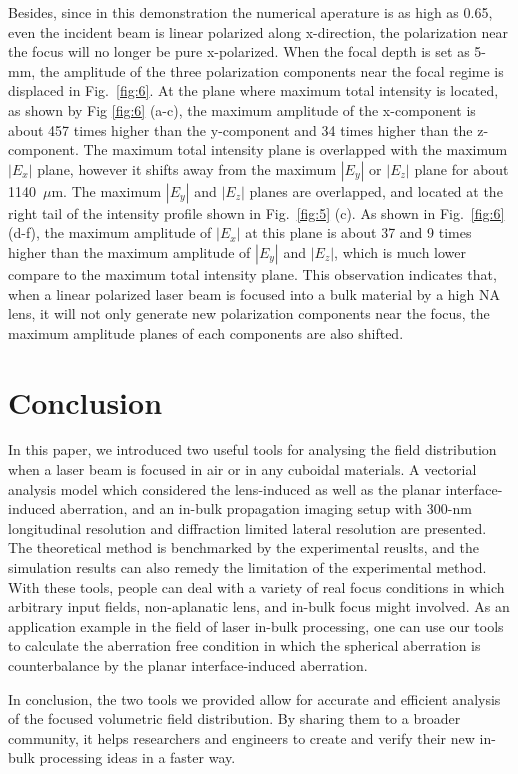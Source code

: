 \documentclass[9pt,twocolumn,twoside]{osajnl}
\begin{document}
Besides, since in this demonstration the numerical aperature is as high as 0.65, even the incident beam is linear polarized along x-direction, the polarization near the focus will no longer be pure x-polarized. When the focal depth is set as 5-mm, the amplitude of the three polarization components near the focal regime is displaced in Fig.~\ref{fig:6}. At the plane where maximum total intensity is located, as shown by Fig \ref{fig:6} (a-c), the maximum amplitude of the x-component is about 457 times higher than the y-component and 34 times higher than the z-component. The maximum total intensity plane is overlapped with the maximum $|E_x|$ plane, however it shifts away from the maximum $|E_y|$ or $|E_z|$ plane for about 1140~$\mu$m. The maximum $|E_y|$ and $|E_z|$ planes are overlapped, and located at the right tail of the intensity profile shown in Fig.~\ref{fig:5} (c). As shown in Fig.~\ref{fig:6} (d-f), the maximum amplitude of $|E_x|$ at this plane is about 37 and 9 times higher than the maximum amplitude of $|E_y|$ and $|E_z|$, which is much lower compare to the maximum total intensity plane. This observation indicates that, when a linear polarized laser beam is focused into a bulk material by a high NA lens, it will not only generate new polarization components near the focus, the maximum amplitude planes of each components are also shifted.
\section{Conclusion}
In this paper, we introduced two useful tools for analysing the field distribution when a laser beam is focused in air or in any cuboidal materials. A vectorial analysis model which considered the lens-induced as well as the planar interface-induced aberration, and an in-bulk propagation imaging setup with 300-nm longitudinal resolution and diffraction limited lateral resolution are presented. The theoretical method is benchmarked by the experimental reuslts, and the simulation results can also remedy the limitation of the experimental method. With these tools, people can deal with a variety of real focus conditions in which arbitrary input fields, non-aplanatic lens, and in-bulk focus might involved. As an application example in the field of laser in-bulk processing, one can use our tools to calculate the aberration free condition in which the spherical aberration is counterbalance by the planar interface-induced aberration.

In conclusion, the two tools we provided allow for accurate and efficient analysis of the focused volumetric field distribution. By sharing them to a broader community, it helps researchers and engineers to create and verify their new in-bulk processing ideas in a faster way.




\end{document}
